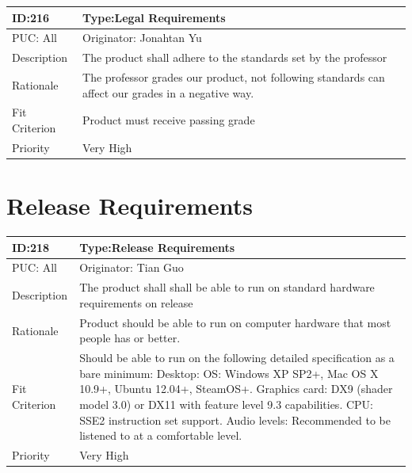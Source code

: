 \documentclass{article}
\begin{document}
	\begin{table}[H]
		\begin{tabular}{|l|l|l|}
			\hline
			ID:216 & \multicolumn{2}{l|}{Type:Legal Requirements} \\ \hline
			PUC: All & \multicolumn{2}{l|}{Originator: Jonahtan Yu} \\ \hline
			Description & \multicolumn{2}{m{0.85\textwidth}|}{The product shall adhere to the standards set by the professor} \\ \hline
			Rationale & \multicolumn{2}{m{0.85\textwidth}|}{The professor grades our product, not following standards can affect our grades in a negative way.} \\ \hline
			Fit Criterion & \multicolumn{2}{m{0.85\textwidth}|}{Product must receive passing grade} \\ \hline
			Priority& \multicolumn{2}{m{0.85\textwidth}|}{Very High} \\ \hline
		\end{tabular}
	\end{table}



	
	\section{Release Requirements}

	\begin{table}[H]
		\begin{tabular}{|l|l|l|}
			\hline
			ID:218 & \multicolumn{2}{l|}{Type:Release Requirements} \\ \hline
			PUC: All & \multicolumn{2}{l|}{Originator: Tian Guo} \\ \hline
			Description & \multicolumn{2}{m{0.85\textwidth}|}{The product shall shall be able to run on standard hardware requirements on release} \\ \hline
			Rationale & \multicolumn{2}{m{0.85\textwidth}|}{Product should be able to run on computer hardware that most people has or better.} \\ \hline
			Fit Criterion & \multicolumn{2}{m{0.85\textwidth}|}{Should be able to run on the following detailed specification as a bare minimum: Desktop: OS: Windows XP SP2+, Mac OS X 10.9+, Ubuntu 12.04+, SteamOS+. Graphics card: DX9 (shader model 3.0) or DX11 with feature level 9.3 capabilities. CPU: SSE2 instruction set support. Audio levels: Recommended to be listened to at a comfortable level.} \\ \hline
			Priority& \multicolumn{2}{m{0.85\textwidth}|}{Very High} \\ \hline
		\end{tabular}
	\end{table}
\end{document}
